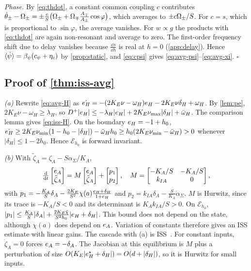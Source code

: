 \emph{Phase.}
By \eqref{eq:thdot}, a constant common coupling $c$ contributes
$\dot\theta_\pm-\Omega_\pm=\pm\tfrac{c}{S}\big(\Omega_\pm+\Omega_\mp\tfrac{A_\mp}{A_\pm}\cos\varphi\big)$,
which averages to $\pm c\Omega_\pm/S$.
For $c=s$, which is proportional to $\sin\varphi$, the average vanishes.
For $w\propto g$ the products with \eqref{eq:thdot} are again non-resonant and
average to zero.
The first-order frequency shift due to delay vanishes because $\frac{\dd s}{\dd
h}$ is real at $h=0$ (\cref{app:delay}).
Hence $\langle \dot\psi\rangle=\beta_\psi(c_\psi+\eta_c)$ by \cref{prop:static}, and
\eqref{eq:cpsi} gives \eqref{eq:avg-psi}--\eqref{eq:avg-xi}.
\hfill$\square$

\subsection{Proof of \cref{thm:iss-avg}}\label{app:iss}
\emph{(a)} Rewrite \eqref{eq:avg-H} as
$\dot{e_H}=-(2K_E\nu-\omega_H)e_H-2K_E\nu\delta_H+\omega_H$.
By \cref{lem:pe}, $2K_E\nu-\omega_H\ge\lambda_H$, so
$D^+|e_H|\le-\lambda_H|e_H|+2K_E\nu_{\max}|\delta_H|+\bar\omega_H$.
The comparison lemma gives \eqref{eq:iss-H}.
On the boundary $e_H=-1+h_0$,
$\dot{e_H}\ge2K_E\nu_{\min}(1-h_0-|\delta_H|)-\bar\omega_Hh_0
\ge h_0(2K_E\nu_{\min}-\bar\omega_H)>0$ whenever $|\delta_H|\le1-2h_0$.
Hence $\mathcal E_{h_0}$ is forward invariant.

\emph{(b)} With $\tilde\zeta_A=\zeta_A-S\alpha_\Sigma/K_A$,
\[
  \tfrac{\mathrm{d}}{\mathrm{d} t}\begin{bmatrix}e_A\\\tilde\zeta_A\end{bmatrix}
  =M\begin{bmatrix}e_A\\\tilde\zeta_A\end{bmatrix}+\begin{bmatrix}p_1\\p_2\end{bmatrix},\quad
  M=\begin{bmatrix}-K_A/S&-K_A/S\\k_{IA}&0\end{bmatrix},
\]
with $p_1=-\tfrac{K_A}{S}\delta_A-\tfrac{2K_E}{S^2}\chi(a)\tfrac{e_H+\delta_H}{1+e_H}$
and $p_2=k_{IA}\delta_A-\tfrac{S}{K_A}\dot\alpha_\Sigma$.
$M$ is Hurwitz, since its trace is $-K_A/S<0$ and its determinant is
$K_Ak_{IA}/S>0$.
On $\mathcal E_{h_0}$,
$|p_1|\le\tfrac{K_A}{S}|\delta_A|+\tfrac{2K_E\bar\chi}{S^2h_0}|e_H+\delta_H|$.
This bound does not depend on the state, although $\chi(a)$ does depend on $e_A$.
Variation of constants therefore gives an ISS estimate with linear gains.
The cascade with (a) is ISS~\citep{sontag1989smooth,sontag2008input}.
For constant inputs, $\dot\zeta_A=0$ forces $e_A=-\delta_A$.
The Jacobian at this equilibrium is $M$ plus a perturbation of size
$O(K_E|e_H^\star+\delta_H|)=O(d+|\delta_H|)$, so it is Hurwitz for small inputs.

